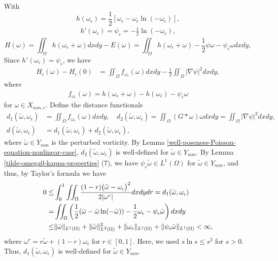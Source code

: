 \documentclass[1 [leqno, 11pt]{amsart}
\numberwithin{equation}{section}
\let\ep=\epsilon
\begin{document}
\begin{CJK*}{GBK}{song}
With $$h(\omega_\epsilon) = \frac 1 2 \left[ \omega_\epsilon - \omega_\epsilon \ln(-\omega_\epsilon) \right],$$
\begin{align*}
h'(\omega_\epsilon) = \psi_\epsilon = -\frac 1 2 \ln(-\omega_\epsilon),
\end{align*}
$$H(\omega) = \iint_{\Omega}h(\omega_\ep + \omega )dxdy - E(\omega) = \iint_{\Omega}h(\omega_\ep + \omega ) - \frac 1 2\psi \omega - \psi_\ep \omega dxdy,$$
\fi
Since $h'(\omega_\ep)=\psi_\ep$,  we have
\begin{align*}
H_\ep(\omega) - H_\ep(0)
& =  \iint_{\Omega} f_{\omega_\ep}(\omega) dxdy-\frac 1 2\iint_\Omega  |\nabla\psi|^2 dxdy,
\end{align*}
where
\begin{align*}
f_{\omega_\ep}(\omega) = h(\omega_\ep + \omega ) - h(\omega_\ep)  - \psi_\ep \omega
\end{align*}
for  $\omega \in X_{non,\ep}$.
Define the distance functionals
\begin{align}\nonumber
d_{1}(\tilde\omega,\omega_\ep)&=\iint_{\Omega}f_{\omega_\ep}(\omega)dxdy,\quad d_2(\tilde\omega,\omega_\ep)=\iint_{\Omega}(G*\omega)\omega dxdy=\iint_{\Omega}|\nabla\psi|^2dxdy,\\\label{distance-euler case}
d(\tilde\omega,\omega_\ep)&=d_{1}(\tilde\omega,\omega_\ep)+d_{2}(\tilde\omega,\omega_\ep),
\end{align}
where $\tilde\omega\in Y_{non}$ is the perturbed vorticity. By Lemma \ref{well-poseness-Poisson-equation-nonlinear-case},  $d_2(\tilde\omega,\omega_\ep)$ is well-defined for $\tilde\omega\in Y_{non}$.
By Lemma \ref{tilde-omega0-kappa-properties} (7), we have $\psi_\ep\tilde \omega\in{L^1(\Omega)}$ for $\tilde\omega\in Y_{non}$, and thus,
 by Taylor's formula we have
\begin{align}\nonumber
0\leq&\int_0^1\iint_\Omega{(1-r)\big(\tilde \omega-\omega_{\ep}\big)^2\over 2|\omega^r|}dxdydr=d_1(\tilde \omega,\omega_{\ep})\\\nonumber
=&\iint_{\Omega}\left({1\over2}(\tilde \omega-\tilde \omega\ln(-\tilde \omega))-{1\over 2}\omega_\ep-\psi_\ep\tilde \omega \right) dxdy\\
\leq&\|\tilde \omega\|_{L^1(\Omega)}+\|\tilde \omega\|_{L^2(\Omega)}^2+\|\omega_\ep\|_{L^1(\Omega)}+\|\psi_\ep\tilde \omega\|_{L^1(\Omega)}<\infty,\label{d1-well-def}
\end{align}
where $\omega^r=r\tilde \omega+(1-r)\omega_{\ep}
$ for $r\in[0,1]$. Here, we used $s\ln s\leq s^2$ for $s>0$. Thus, $d_1(\tilde\omega,\omega_\ep)$ is well-defined for $\tilde\omega\in Y_{non}$.


\end{CJK*}
\end{document}
